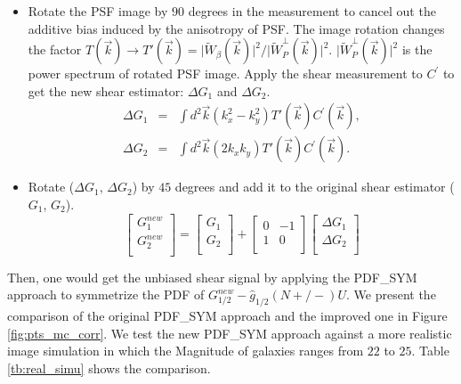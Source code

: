 \documentclass[twocolumn]{aastex62}
\begin{document}
\begin{itemize}
	\item Rotate the PSF image by $90$ degrees in the measurement to cancel out the additive bias induced by the anisotropy of PSF. The image rotation changes the factor $T(\vec{k})\rightarrow T'(\vec{k})=\vert \widetilde{W}_\beta(\vec{k})\vert^2 /\vert \widetilde{W}_P^{\perp}(\vec{k})\vert^2$. $\vert \widetilde{W}_P^{\perp}(\vec{k})\vert^2$ is the power spectrum of rotated PSF image. Apply the shear measurement to $C^{\prime}$ to get the new shear estimator: $\Delta G_1$ and $\Delta G_2$.
	\begin{eqnarray}
	\Delta G_1&=&\int{d}^2\vec{k}\left(k_x^2-k_y^2\right)T'(\vec{k}) C^{\prime}(\vec{k}), \\ \nonumber
	\Delta G_2&=&\int{d}^2\vec{k}\left(2k_xk_y\right)T'(\vec{k}) C^{\prime}(\vec{k}).
	\end{eqnarray}
	\item Rotate ($\Delta G_1$, $\Delta G_2$) by $45$ degrees and add it to the original shear estimator ($G_1$, $G_2$). 
	\begin{equation}
	\left[ \begin{array}{ccc}
	G_1^{new} \\
	G_2^{new} \\
	\end{array} 
	\right ] = 
		\left[ \begin{array}{ccc}
	G_1 \\
	G_2 \\
	\end{array} 
	\right ]
	+
	\left[ \begin{array}{ccc}
		0 & -1 \\
		1 & 0\\
		\end{array} 
	\right ]
	\left[ \begin{array}{ccc}
	\Delta G_1 \\
	\Delta G_2 \\
	\end{array} 
	\right ]
	\end{equation}
\end{itemize}
Then, one would get the unbiased shear signal by applying the PDF\_SYM approach to symmetrize the PDF of $G_{1/2}^{new} - \hat{g}_{1/2}(N+/-)U$. We present the comparison of the original PDF\_SYM approach and the improved one in Figure \ref{fig:pts_mc_corr}. We test the new PDF\_SYM approach against a more realistic image simulation in which the Magnitude of galaxies ranges from $22$ to $25$. Table \ref{tb:real_simu} shows the comparison.
\end{document}
